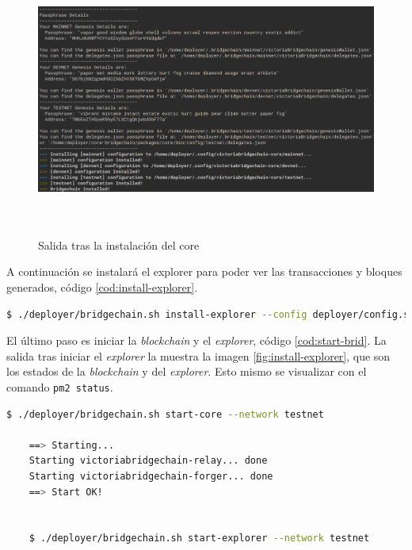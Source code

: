 \begin{figure}[H]
	\centering
	\includegraphics[width=15cm,height=9cm]{figuras/Instalacion_bridgechain.png}
	\caption{Salida tras la instalación del core}
	\label{fig:install-bridge}
\end{figure}

A continuación se instalará el explorer para poder ver las transacciones y bloques generados, código \ref{cod:install-explorer}.

\begin{lstlisting}[language=Bash,caption=Instalación \textit{blockchain}. Parte XII, label=cod:install-explorer, style=Consola]
	$ ./deployer/bridgechain.sh install-explorer --config deployer/config.sample.conf --skip-deps --non-interactive
\end{lstlisting}


El último paso es iniciar la \textit{blockchain} y el \textit{explorer}, código \ref{cod:start-brid}. La salida tras iniciar el \textit{explorer} la muestra la imagen \ref{fig:install-explorer}, que son los estados de la \textit{blockchain} y del \textit{explorer}. Esto mismo se visualizar con el comando \texttt{pm2 status}.\\

\begin{lstlisting}[language=Bash,caption=Instalación \textit{blockchain}. Parte XIII, label=cod:start-brid, style=Consola]
	$ ./deployer/bridgechain.sh start-core --network testnet

	==> Starting...
	Starting victoriabridgechain-relay... done
	Starting victoriabridgechain-forger... done
	==> Start OK!


	$ ./deployer/bridgechain.sh start-explorer --network testnet
\end{lstlisting}



